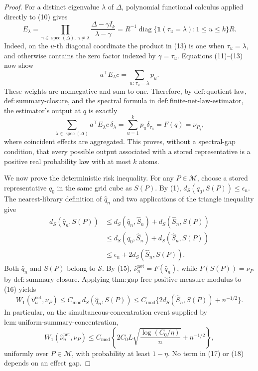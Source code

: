 \documentclass{article}
\begin{document}
\begin{proof}
For a distinct eigenvalue \(\lambda\) of \(\Delta\), polynomial functional calculus applied directly to (10) gives
\[
E_\lambda
=\prod_{\gamma\in\operatorname{spec}(\Delta),\ \gamma\ne\lambda}
 \frac{\Delta-\gamma I_k}{\lambda-\gamma}
=R^{-1}\operatorname{diag}\{\mathbf 1(\tau_u=\lambda):1\le u\le k\}R. \tag{13}
\]
Indeed, on the \(u\)-th diagonal coordinate the product in (13) is one when \(\tau_u=\lambda\), and otherwise contains the zero factor indexed by \(\gamma=\tau_u\).  Equations (11)--(13) now show
\[
a^\top E_\lambda c
=\sum_{u:\,\tau_u=\lambda}p_u. \tag{14}
\]
These weights are nonnegative and sum to one.  Therefore, by \(\mathrm{def:quotient\text{-}law}\), \(\mathrm{def:summary\text{-}closure}\), and the spectral formula in \(\mathrm{def:finite\text{-}net\text{-}law\text{-}estimator}\), the estimator's output at \(q\) is exactly
\[
\sum_{\lambda\in\operatorname{spec}(\Delta)}a^\top E_\lambda c\,\delta_\lambda
=\sum_{u=1}^kp_u\delta_{\tau_u}
=F(q)=\nu_{P_q}, \tag{15}
\]
where coincident effects are aggregated.  This proves, without a spectral-gap condition, that every possible output associated with a stored representative is a positive real probability law with at most \(k\) atoms.

We now prove the deterministic risk inequality.  For any \(P\in\mathcal M\), choose a stored representative \(q_0\) in the same grid cube as \(S(P)\).  By (1), \(d_S(q_0,S(P))\le\epsilon_n\).  The nearest-library definition of \(\widehat q_n\) and two applications of the triangle inequality give
\[
\begin{aligned}
d_S(\widehat q_n,S(P))
&\le d_S(\widehat q_n,\widehat S_n)+d_S(\widehat S_n,S(P))\\
&\le d_S(q_0,\widehat S_n)+d_S(\widehat S_n,S(P))\\
&\le \epsilon_n+2d_S(\widehat S_n,S(P)).
\end{aligned} \tag{16}
\]
Both \(\widehat q_n\) and \(S(P)\) belong to \(\mathscr S\).  By (15), \(\widehat\nu_n^{\mathrm{net}}=F(\widehat q_n)\), while \(F(S(P))=\nu_P\) by \(\mathrm{def:summary\text{-}closure}\).  Applying \(\mathrm{thm:gap\text{-}free\text{-}positive\text{-}measure\text{-}modulus}\) to (16) yields
\[
W_1(\widehat\nu_n^{\mathrm{net}},\nu_P)
\le C_{\mathrm{mod}}d_S(\widehat q_n,S(P))
\le C_{\mathrm{mod}}\{2d_S(\widehat S_n,S(P))+n^{-1/2}\}. \tag{17}
\]
In particular, on the simultaneous-concentration event supplied by \(\mathrm{lem:uniform\text{-}summary\text{-}concentration}\),
\[
W_1(\widehat\nu_n^{\mathrm{net}},\nu_P)
\le C_{\mathrm{mod}}\left\{2C_0L\sqrt{\frac{\log(C_0/\eta)}{n}}+n^{-1/2}\right\}, \tag{18}
\]
uniformly over \(P\in\mathcal M\), with probability at least \(1-\eta\).  No term in (17) or (18) depends on an effect gap.


\end{proof}
\end{document}
